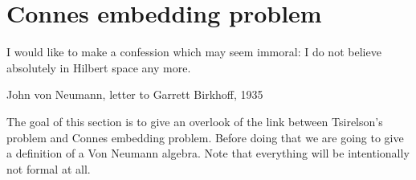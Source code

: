 \section{Connes embedding problem}
\epigraph{I would like to make a confession which may seem immoral: I do not believe absolutely in Hilbert space any more.}{John von Neumann, letter to Garrett Birkhoff, 1935}

The goal of this section is to give an overlook of the link between Tsirelson's problem and Connes embedding problem. Before doing that we are going to give a definition of a Von Neumann algebra. Note that everything will be intentionally not formal at all.

